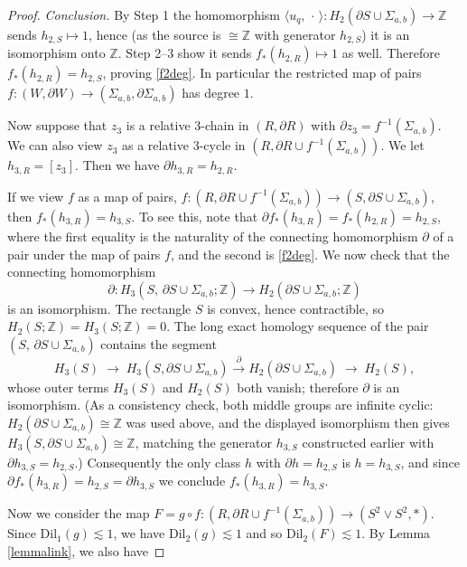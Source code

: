 \documentclass{amsart}
\newtheorem*{theorem 1}{Theorem 1}
\newtheorem*{theorem 2}{Theorem 2}
\newtheorem*{theorem 3}{Theorem 3}
\numberwithin{equation}{section}
\newcommand{\Dil}{\textrm{Dil}}
\newcommand{\ZZ}{\mathbb{Z}}
\begin{document}
\begin{proof}
\medskip
\noindent\emph{Conclusion.}  By Step 1 the homomorphism $\langle u_q,\,\cdot\,\rangle : H_2(\partial S\cup\Sigma_{a,b})\to\ZZ$ sends $h_{2,S}\mapsto 1$, hence (as the source is $\cong\ZZ$ with generator $h_{2,S}$) it is an isomorphism onto $\ZZ$.  Step 2--3 show it sends $f_*(h_{2,R})\mapsto 1$ as well.  Therefore $f_*(h_{2,R}) = h_{2,S}$, proving \eqref{f2deg}.  In particular the restricted map of pairs $f:(W,\partial W)\to(\Sigma_{a,b},\partial\Sigma_{a,b})$ has degree $1$.


Now suppose that $z_3$ is a relative 3-chain in $(R,  \partial R)$ with $\partial z_3 = f^{-1}(\Sigma_{a,b})$.   We can also view $z_3$ as a relative 3-cycle in $(R,  \partial R \cup f^{-1}(\Sigma_{a,b}))$.   We let $h_{3,R} = [z_3]$.   Then we have $\partial h_{3,R} = h_{2,R}$.   

If we view $f$ as a map of pairs,  $f: (R,  \partial R \cup f^{-1} (\Sigma_{a,b})) \rightarrow (S,  \partial S \cup \Sigma_{a,b})$,  then $f_*(h_{3,R}) = h_{3,S}$.   To see this,  note that  $\partial f_*(h_{3,R}) = f_*(h_{2,R}) = h_{2, S}$, where the first equality is the naturality of the connecting homomorphism $\partial$ of a pair under the map of pairs $f$, and the second is \eqref{f2deg}.  We now check that the connecting homomorphism
$$ \partial : H_3(S,\,\partial S\cup\Sigma_{a,b};\ZZ) \longrightarrow H_2(\partial S\cup\Sigma_{a,b};\ZZ) $$
is an isomorphism.  The rectangle $S$ is convex, hence contractible, so $H_2(S;\ZZ)=H_3(S;\ZZ)=0$.  The long exact homology sequence of the pair $(S,\,\partial S\cup\Sigma_{a,b})$ contains the segment
$$ H_3(S) \;\longrightarrow\; H_3(S,\partial S\cup\Sigma_{a,b}) \xrightarrow{\ \partial\ } H_2(\partial S\cup\Sigma_{a,b}) \;\longrightarrow\; H_2(S), $$
whose outer terms $H_3(S)$ and $H_2(S)$ both vanish; therefore $\partial$ is an isomorphism.  (As a consistency check, both middle groups are infinite cyclic: $H_2(\partial S\cup\Sigma_{a,b})\cong\ZZ$ was used above, and the displayed isomorphism then gives $H_3(S,\partial S\cup\Sigma_{a,b})\cong\ZZ$, matching the generator $h_{3,S}$ constructed earlier with $\partial h_{3,S}=h_{2,S}$.)  Consequently the only class $h$ with $\partial h = h_{2,S}$ is $h = h_{3,S}$, and since $\partial f_*(h_{3,R}) = h_{2,S} = \partial h_{3,S}$ we conclude $f_*(h_{3,R}) = h_{3,S}$.   

Now we consider the map $F = g \circ f: (R, \partial R \cup f^{-1}(\Sigma_{a,b}))  \rightarrow (S^2 \vee S^2, *)$.   Since $\Dil_1(g) \lesssim 1$,  we have $\Dil_2(g) \lesssim 1$ and so $\Dil_2( F) \lesssim 1$.   By Lemma \ref{lemmalink},  we also have


\end{proof}
\end{document}
